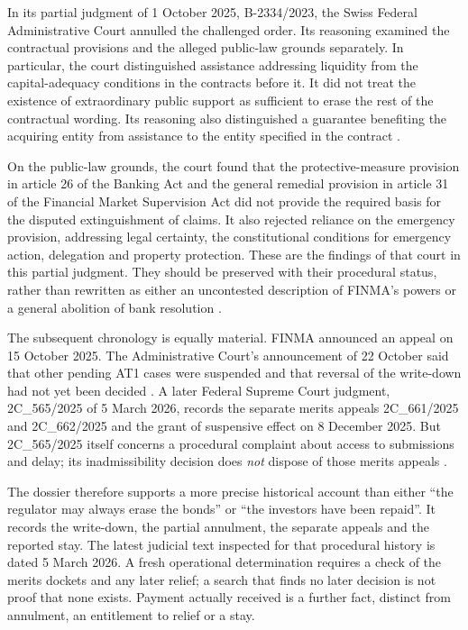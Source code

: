 In its partial judgment of 1 October 2025, B-2334/2023, the Swiss Federal
Administrative Court annulled the challenged order. Its reasoning examined the
contractual provisions and the alleged public-law grounds separately. In
particular, the court distinguished assistance addressing liquidity from the
capital-adequacy conditions in the contracts before it. It did not treat the
existence of extraordinary public support as sufficient to erase the rest of
the contractual wording. Its reasoning also distinguished a guarantee benefiting
the acquiring entity from assistance to the entity specified in the contract
\citep[reasons~5.3--5.5, especially 5.4.4--5.4.8]{csat1judgment2025}.

On the public-law grounds, the court found that the protective-measure provision
in article 26 of the Banking Act and the general remedial provision in article
31 of the Financial Market Supervision Act did not provide the required basis
for the disputed extinguishment of claims. It also rejected reliance on the
emergency provision, addressing legal certainty, the constitutional conditions
for emergency action, delegation and property protection. These are the
findings of that court in this partial judgment. They should be preserved with
their procedural status, rather than rewritten as either an uncontested
description of FINMA's powers or a general abolition of bank resolution
\citep[reasons~6.8--6.10, 7.6--7.11, 8 and 10]{csat1judgment2025}.

The subsequent chronology is equally material. FINMA announced an appeal on
15 October 2025. The Administrative Court's announcement of 22 October said
that other pending AT1 cases were suspended and that reversal of the write-down
had not yet been decided \citep{csat1appeal2025,csat1suspension2025}.
A later Federal Supreme Court judgment,
2C\_565/2025 of 5 March 2026, records the separate merits appeals
2C\_661/2025 and 2C\_662/2025 and the grant of suspensive effect on
8 December 2025. But 2C\_565/2025 itself concerns a procedural complaint
about access to submissions and delay; its inadmissibility decision does
\emph{not} dispose of those merits appeals
\citep[facts~D, reasons~1.1--1.4 and operative order]{csat1procedure2026}.

The dossier therefore supports a more precise historical account than either
``the regulator may always erase the bonds'' or ``the investors have been
repaid''. It records the write-down, the partial annulment, the separate appeals
and the reported stay. The latest judicial text inspected for that procedural
history is dated 5 March 2026. A fresh operational determination requires a
check of the merits dockets and any later relief; a search that finds no later
decision is not proof that none exists. Payment actually received is a further
fact, distinct from annulment, an entitlement to relief or a stay.

